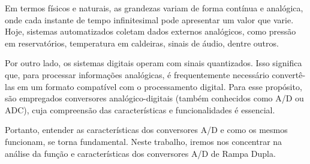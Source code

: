 Em termos físicos e naturais, as grandezas variam de forma contínua e analógica, onde cada instante de tempo infinitesimal pode apresentar um valor que varie. Hoje, sistemas automatizados coletam dados externos analógicos, como pressão em reservatórios, temperatura em caldeiras, sinais de áudio, dentre outros.

Por outro lado, os sistemas digitais operam com sinais quantizados. Isso significa que, para processar informações analógicas, é frequentemente necessário convertê-las em um formato compatível com o processamento digital. Para esse propósito, são empregados conversores analógico-digitais (também conhecidos como A/D ou ADC), cuja compreensão das características e funcionalidades é essencial.

Portanto, entender as características dos conversores A/D e como os mesmos funcionam, se torna fundamental. Neste trabalho, iremos nos concentrar na análise da função e características dos conversores A/D de Rampa Dupla.
